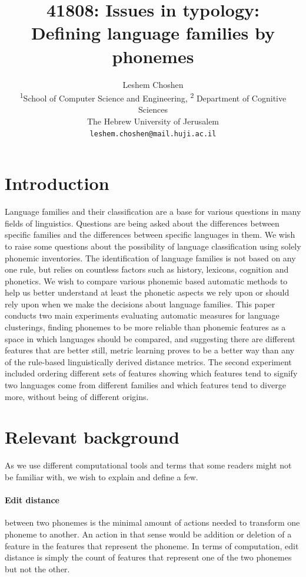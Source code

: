 \documentclass[letterpaper, 11pt]{article}
\begin{document}
\title{41808: Issues in typology:\\Defining language families by phonemes}
\author{
  Leshem Choshen \\
  \textsuperscript{1}School of Computer Science and Engineering,
  \textsuperscript{2} Department of Cognitive Sciences \\
  The Hebrew University of Jerusalem \\
  \texttt{leshem.choshen@mail.huji.ac.il}\\
}
\maketitle
\section{Introduction}
Language families and their classification are a base for various questions in many fields of linguistics. Questions are being asked about the differences between specific families and the differences between specific languages in them. We wish to raise some questions about the possibility of language classification using solely phonemic inventories. The identification of language families is not based on any one rule, but relies on countless factors such as history, lexicons, cognition and phonetics. We wish to compare various phonemic based automatic methods to help us better understand at least the phonetic aspects we rely upon or should rely upon when we make the decisions about language families. This paper conducts two main experiments evaluating automatic measures for language clusterings, finding phonemes to be more reliable than phonemic features as a space in which languages should be compared, and suggesting there are different features that are better still, metric learning proves to be a better way than any of the rule-based linguistically derived distance metrics. The second experiment included ordering different sets of features showing which features tend to signify two languages come from different families and which features tend to diverge more, without being of different origins.

\section{Relevant background}
As we use different computational tools and terms that some readers might not be familiar with, we wish to explain and define a few.
\paragraph{Edit distance} between two phonemes is the minimal amount of actions needed to transform one phoneme to another. An action in that sense would be addition or deletion of a feature in the features that represent the phoneme. In terms of computation, edit distance is simply the count of features that represent one of the two phonemes but not the other.
\end{document}
